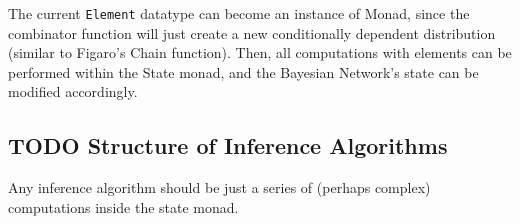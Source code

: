\documentclass[11pt]{article}
\begin{document}
The current \texttt{Element} datatype can become an instance of Monad,
since the combinator function will just create a new conditionally
dependent distribution (similar to Figaro's Chain function). Then,
all computations with elements can be performed within the State monad,
and the Bayesian Network's state can be modified accordingly.

\subsection{{\bfseries\sffamily TODO} Structure of Inference Algorithms}
\label{sec-2-5}
Any inference algorithm should be just a series of (perhaps complex) computations
inside the state monad.
\end{document}
